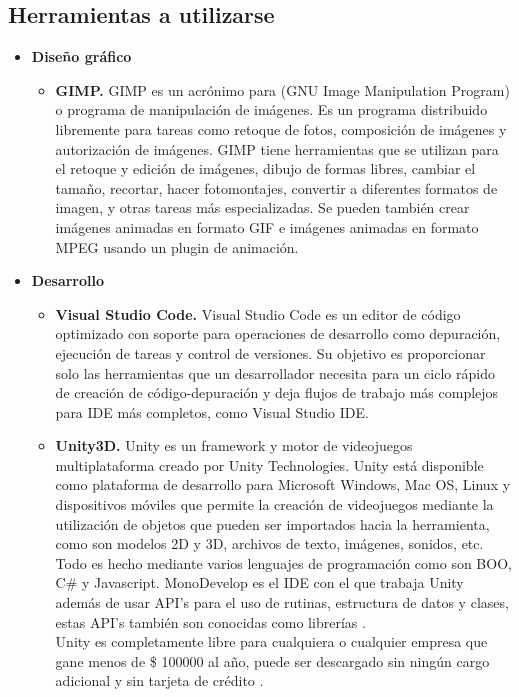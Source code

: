 \documentclass[a4paper, openright, 12pt]{report}
\begin{document}
\subsection*{Herramientas a utilizarse}
\begin{itemize}
\item \textbf{Diseño gráfico}
\begin{itemize}
\item \textbf{GIMP.} GIMP es un acrónimo para (GNU Image Manipulation Program) o programa de manipulación de imágenes. Es un programa distribuido libremente para tareas como retoque de fotos, composición de imágenes y autorización de imágenes. GIMP tiene herramientas que se utilizan para el retoque y edición de imágenes, dibujo de formas libres, cambiar el tamaño, recortar, hacer fotomontajes, convertir a diferentes formatos de imagen, y otras tareas más especializadas. Se pueden también crear imágenes animadas en formato GIF e imágenes animadas en formato MPEG usando un plugin de animación. \cite{gimp2020}
\end{itemize}
\item \textbf{Desarrollo}
\begin{itemize}
\item \textbf{Visual Studio Code.} Visual Studio Code es un editor de código optimizado con soporte para operaciones de desarrollo como depuración, ejecución de tareas y control de versiones. Su objetivo es proporcionar solo las herramientas que un desarrollador necesita para un ciclo rápido de creación de código-depuración y deja flujos de trabajo más complejos para IDE más completos, como Visual Studio IDE. \cite{vsc2020}
\item \textbf{Unity3D.} Unity es un framework y motor de videojuegos multiplataforma creado por Unity Technologies. Unity está disponible como plataforma de desarrollo para Microsoft Windows, Mac OS, Linux y dispositivos móviles que permite la creación de videojuegos mediante la utilización de objetos que pueden ser importados hacia la herramienta, como son modelos 2D y 3D, archivos de texto, imágenes, sonidos, etc. Todo es hecho mediante varios lenguajes de programación como son BOO, C\# y Javascript. MonoDevelop es el IDE con el que trabaja Unity además de usar API's para el uso de rutinas, estructura de datos y clases, estas API's también son conocidas como librerías \cite{okita2014learning}.\\
Unity es completamente libre para cualquiera o cualquier empresa que gane menos de \$ 100000 al año, puede ser descargado sin ningún cargo adicional y sin tarjeta de crédito \cite{murray2014c}.
\end{itemize}
\end{itemize}
\end{document}
